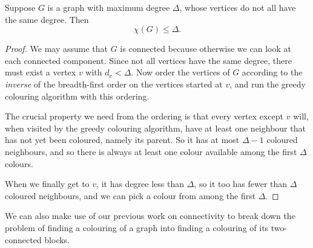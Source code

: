 \documentclass[nobib]{tufte-handout}
\begin{document}
\begin{lemma}\label{lemma:brooks_for_irregular}
  Suppose $G$ is a graph with maximum degree $\Delta$, whose vertices do not all have the same degree. Then
  $$\chi(G) \leq \Delta.$$

  \begin{proof}
    We may assume that \(G\) is connected because otherwise we can look at each connected component. Since not all vertices have the same degree, there must exist a vertex $v$ with $d_v < \Delta$. Now order the vertices of $G$ according to the \emph{inverse} of the breadth-first order on the vertices started at $v$, and run the greedy colouring algorithm with this ordering.

    The crucial property we need from the ordering is that every vertex except $v$ will, when visited by the greedy colouring algorithm, have at least one neighbour that has not yet been coloured, namely its parent. So it has at most $\Delta - 1$ coloured neighbours, and so there is always at least one colour available among the first $\Delta$ colours.

    When we finally get to $v$, it has degree less than $\Delta$, so it too has fewer than $\Delta$ coloured neighbours, and we can pick a colour from among the first $\Delta$.
  \end{proof}
\end{lemma}

We can also make use of our previous work on connectivity to break down the problem of finding a colouring of a graph into finding a colouring of its two-connected blocks.
\end{document}
